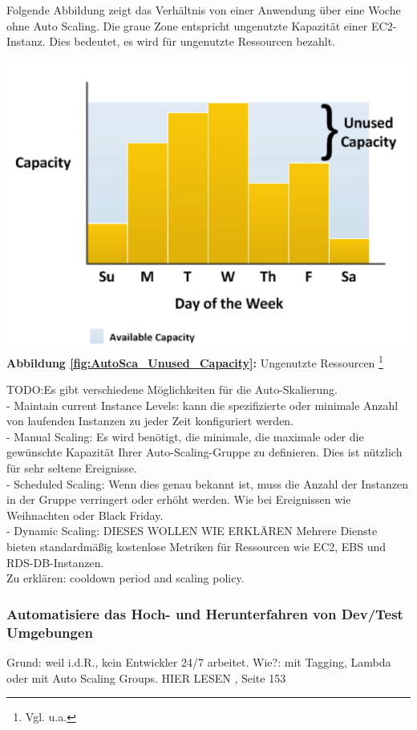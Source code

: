 Folgende Abbildung zeigt das Verhältnis von einer Anwendung über eine Woche ohne Auto Scaling.
Die graue Zone entspricht ungenutzte Kapazität einer EC2-Instanz. Dies bedeutet, es wird für ungenutzte Ressourcen bezahlt.
\begin{center}
    \includegraphics[scale=0.7]{sources/AutoCap Unused Capacity}\label{fig:AutoSca_Unused_Capacity}\\
    \textbf{Abbildung \autoref{fig:AutoSca_Unused_Capacity}:} Ungenutzte Ressourcen
    \footnote{Vgl. u.a.\cite{AMZ01}}
\end{center}
TODO:Es gibt verschiedene Möglichkeiten für die Auto-Skalierung.
\\
- Maintain current Instance Levels: kann die spezifizierte oder minimale Anzahl von laufenden Instanzen zu jeder Zeit konfiguriert werden.
\\
- Manual Scaling: Es wird benötigt, die minimale, die maximale oder die gewünschte Kapazität Ihrer Auto-Scaling-Gruppe zu definieren. Dies ist nützlich für sehr seltene Ereignisse. 
\\
- Scheduled Scaling: Wenn dies genau bekannt ist, muss die Anzahl der Instanzen in der Gruppe verringert oder erhöht werden. Wie bei Ereignissen wie Weihnachten oder Black Friday.
\\
- Dynamic Scaling: DIESES WOLLEN WIE ERKLÄREN
Mehrere Dienste bieten standardmäßig kostenlose Metriken für Ressourcen wie EC2, EBS und RDS-DB-Instanzen.
\\
Zu erklären: cooldown period and scaling policy.


\subsubsection{Automatisiere das Hoch- und Herunterfahren von Dev/Test Umgebungen}
Grund: weil i.d.R., kein Entwickler 24/7 arbeitet.
Wie?: mit Tagging, Lambda oder mit Auto Scaling Groups.
HIER LESEN {\cite{CCB}, Seite 153}
